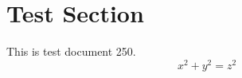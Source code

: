 \documentclass{article}
\begin{document}
\section{Test Section}
This is test document 250.
\begin{equation}
x^2 + y^2 = z^2
\end{equation}
\end{document}
